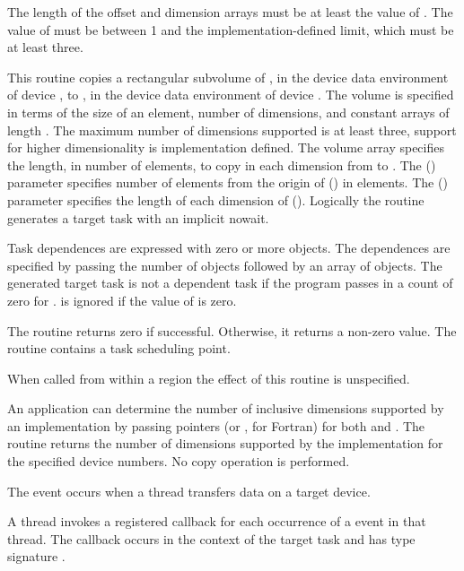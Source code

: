 The length of the offset and dimension arrays must be at least the
value of .
The value of  must be between 1 and the implementation-defined
limit, which must be at least three.

\effect
This routine copies a rectangular subvolume of ,
in the device data environment of device ,
to , in the device data environment of device .
The volume is specified in terms of the size of an element,
number of dimensions, and constant arrays of length .  The
maximum number of dimensions supported is at least three, support for higher
dimensionality is implementation defined. The volume array specifies the
length, in number of elements, to copy in each dimension from 
to . The  () parameter specifies
number of elements from the origin of  () in elements.
The  () parameter specifies the
length of each dimension of  ().
Logically the  routine generates a target task with an implicit nowait.

Task dependences are expressed with zero or more 
objects. The dependences are specified by passing the
number of  objects followed by an array of
 objects. The generated target task is not a
dependent task if the program passes in a count of zero for
.   is ignored if the value of
 is zero.

The routine returns zero if successful.
Otherwise, it returns a non-zero value. The
routine contains a task scheduling point.

When called from within a  region
the effect of this routine is unspecified.

An application can determine the number of
inclusive dimensions supported by an implementation by passing
 pointers (or , for Fortran) for both  and .
The routine returns the number of dimensions supported
by the implementation for the specified device numbers.
No copy operation is performed.

\events
The  event occurs when a thread transfers data on a target device.

\tools
A thread invokes a registered 
callback for each occurrence of a  event in that
thread. The callback occurs in the context of the target task and has
type signature .

